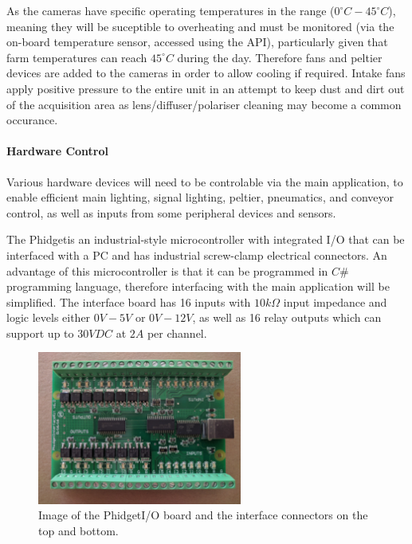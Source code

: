 \documentclass[fleqn,twoside]{article}
\begin{document}
As the cameras have specific operating temperatures in the range ($0^{\circ}C-45^{\circ}C$), meaning they will be suceptible to overheating and must be monitored (via the on-board temperature sensor, accessed using the API), particularly given that farm temperatures can reach $45^{\circ}C$ during the day. Therefore fans and peltier devices are added to the cameras in order to allow cooling if required. Intake fans apply positive pressure to the entire unit in an attempt to keep dust and dirt out of the acquisition area as lens/diffuser/polariser cleaning may become a common occurance.


\paragraph{Hardware Control}
\label{sec:phidget}

Various hardware devices will need to be controlable via the main application, to enable efficient main lighting, signal lighting, peltier, pneumatics, and conveyor control, as well as inputs from some peripheral devices and sensors.

The Phidget\texttrademark is an industrial-style microcontroller with integrated I/O that can be interfaced with a PC and has industrial screw-clamp electrical connectors. An advantage of this microcontroller is that it can be programmed in $C\#$ programming language, therefore interfacing with the main application will be simplified. The interface board has 16 inputs with $10k\Omega$ input impedance and logic levels either $0V-5V$ or $0V-12V$, as well as 16 relay outputs which can support up to $30VDC$ at $2A$ per channel. 


\begin{figure}
	\begin{center}
		\includegraphics[width=0.6\textwidth]{phidget.jpg}
	\end{center}
	\caption{Image of the Phidget\texttrademark I/O board and the interface connectors on the top and bottom.}
	\label{fig:phidget}
\end{figure} 
\end{document}
